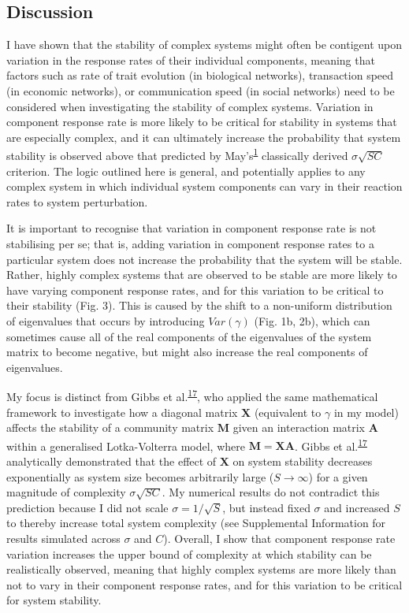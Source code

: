 \documentclass[]{article}
\begin{document}
\subsection{Discussion}\label{discussion}

I have shown that the stability of complex systems might often be
contigent upon variation in the response rates of their individual
components, meaning that factors such as rate of trait evolution (in
biological networks), transaction speed (in economic networks), or
communication speed (in social networks) need to be considered when
investigating the stability of complex systems. Variation in component
response rate is more likely to be critical for stability in systems
that are especially complex, and it can ultimately increase the
probability that system stability is observed above that predicted by
May's\textsuperscript{\protect\hyperlink{ref-May1972}{1}} classically
derived \(\sigma \sqrt{SC}\) criterion. The logic outlined here is
general, and potentially applies to any complex system in which
individual system components can vary in their reaction rates to system
perturbation.

It is important to recognise that variation in component response rate
is not stabilising per se; that is, adding variation in component
response rates to a particular system does not increase the probability
that the system will be stable. Rather, highly complex systems that are
observed to be stable are more likely to have varying component response
rates, and for this variation to be critical to their stability (Fig.
3). This is caused by the shift to a non-uniform distribution of
eigenvalues that occurs by introducing \(Var(\gamma)\) (Fig. 1b, 2b),
which can sometimes cause all of the real components of the eigenvalues
of the system matrix to become negative, but might also increase the
real components of eigenvalues.

My focus is distinct from Gibbs et
al.\textsuperscript{\protect\hyperlink{ref-Gibbs2017}{17}}, who applied
the same mathematical framework to investigate how a diagonal matrix
\(\mathbf{X}\) (equivalent to \(\gamma\) in my model) affects the
stability of a community matrix \(\mathbf{M}\) given an interaction
matrix \(\mathbf{A}\) within a generalised Lotka-Volterra model, where
\(\mathbf{M} = \mathbf{XA}\). Gibbs et
al.\textsuperscript{\protect\hyperlink{ref-Gibbs2017}{17}} analytically
demonstrated that the effect of \(\mathbf{X}\) on system stability
decreases exponentially as system size becomes arbitrarily large
(\(S \to \infty\)) for a given magnitude of complexity
\(\sigma\sqrt{SC}\). My numerical results do not contradict this
prediction because I did not scale \(\sigma = 1 / \sqrt{S}\), but
instead fixed \(\sigma\) and increased \(S\) to thereby increase total
system complexity (see Supplemental Information for results simulated
across \(\sigma\) and \(C\)). Overall, I show that component response
rate variation increases the upper bound of complexity at which
stability can be realistically observed, meaning that highly complex
systems are more likely than not to vary in their component response
rates, and for this variation to be critical for system stability.
\end{document}
